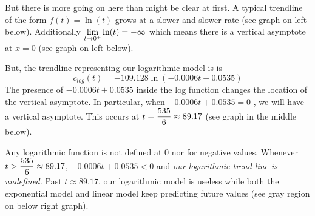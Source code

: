 \documentclass[11pt]{article}
\begin{document}
{{{ \item But there is more going on here than might be clear at first. A typical trendline of the form $f(t)=\ln( t)$ grows at a slower and slower rate (see graph on left below). Additionally  $\displaystyle 
 \lim_{t\to 0^+}\ln(t) =-\infty$ which means there is a vertical asymptote at $x=0$ (see graph on left below).
\item But, the trendline representing our logarithmic  model is is $$ c_{log}(t)=-109.128\ln\left( -0.0006t +0.0535\right)$$
The presence of  $ -0.0006t +0.0535$ inside the log function changes the location of the vertical asymptote.  In particular, when  $-0.0006t +0.0535=0$ , we will have a vertical asymptote. This occurs at $\displaystyle t=\frac{535}{6}\approx 89.17$  (see graph in the middle below).
\item  Any logarithmic function is not defined at $0$ nor for negative values. Whenever $\displaystyle t>\frac{535}{6}\approx 89.17$, $-0.0006t +0.0535<0$ and  {\em our logarithmic trend line is undefined.} Past $t\approx 89.17$, our logarithmic model is useless while both the exponential model and linear model keep predicting future values (see gray region on below right graph).
 }

}}
\end{document}

